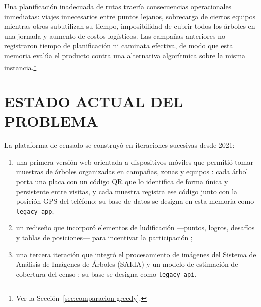 Una planificación inadecuada de rutas traería consecuencias operacionales inmediatas: viajes
innecesarios entre puntos lejanos, sobrecarga de ciertos equipos mientras otros subutilizan su
tiempo, imposibilidad de cubrir todos los árboles en una jornada y aumento de costos logísticos. Las
campañas anteriores no registraron tiempo de planificación ni caminata efectiva, de modo que esta
memoria evalúa el producto contra una alternativa algorítmica sobre la misma
instancia.\footnote{Ver la Sección~\ref{sec:comparacion-greedy}.}

\section{ESTADO ACTUAL DEL PROBLEMA}
\label{sec:estado-actual}

La plataforma de censado se construyó en iteraciones sucesivas desde 2021:
\begin{enumerate}[label=\alph*)]
  \item una primera versión web orientada a dispositivos móviles que permitió tomar muestras de
    árboles organizadas en campañas, zonas y equipos \citep{castro-diaz2022}: cada árbol porta una
    placa con un código QR que lo identifica de forma única y persistente entre visitas, y cada
    muestra registra ese código junto con la posición GPS del teléfono; su base de datos se
    designa en esta memoria como \texttt{legacy\_app};
  \item un rediseño que incorporó elementos de ludificación ---puntos, logros, desafíos y tablas de
    posiciones--- para incentivar la participación \citep{binder-cortes2023};
  \item una tercera iteración que integró el procesamiento de imágenes del Sistema de Análisis de
    Imágenes de Árboles (SAIdA) y un modelo de estimación de cobertura del censo
    \citep{pizarro-zumaeta2024}; su base se designa como \texttt{legacy\_api}.
\end{enumerate}
